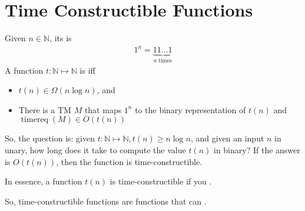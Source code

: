 \documentclass[a4paper]{report}
\newcommand{\bookref}[3]{\marginpar{\faBook{}~#1\\Chapter #2\\Section #3}}
\theoremstyle{definition}
\DeclareMathOperator*{\treq}{timereq}
\begin{document}
\section{Time Constructible Functions}
\bookref{ER}{28}{28.9.1}
Given $n \in \mathbb{N}$, its  is
%
\begin{align*}
1^n = \underbrace{11\dots{}1}_{n \;\text{times}}
\end{align*}
%
A function $t : \mathbb{N} \mapsto \mathbb{N}$ is  iff
\begin{itemize}
\item $t(n) \in \Omega(n \log n)$, and
\item There is a TM $M$ that maps $1^n$ to the binary representation of $t(n)$ and $\treq(M) \in O(t(n))$
\end{itemize}
%
So, the question is: given $t : \mathbb{N} \mapsto \mathbb{N}, t(n) \geq n\log n$, and given an input $n$ in unary, how long does it take to compute the value $t(n)$ in binary? If the answer is $O(t(n))$, then the function is time-constructible.

In essence, a function $t(n)$ is  time-constructible if you .

So, time-constructible functions are functions that can .

\end{document}
